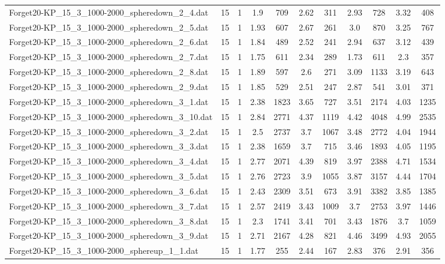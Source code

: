 \begin{table}[!ht]
\begin{tabular}{lcccccccccc}
Forget20-KP\_15\_3\_1000-2000\_spheredown\_2\_4.dat & 15 & 1 & 1.9 & 709 & 2.62 & 311 & 2.93 & 728 & 3.32 & 408 \\
Forget20-KP\_15\_3\_1000-2000\_spheredown\_2\_5.dat & 15 & 1 & 1.93 & 607 & 2.67 & 261 & 3.0 & 870 & 3.25 & 767 \\
Forget20-KP\_15\_3\_1000-2000\_spheredown\_2\_6.dat & 15 & 1 & 1.84 & 489 & 2.52 & 241 & 2.94 & 637 & 3.12 & 439 \\
Forget20-KP\_15\_3\_1000-2000\_spheredown\_2\_7.dat & 15 & 1 & 1.75 & 611 & 2.34 & 289 & 1.73 & 611 & 2.3 & 357 \\
Forget20-KP\_15\_3\_1000-2000\_spheredown\_2\_8.dat & 15 & 1 & 1.89 & 597 & 2.6 & 271 & 3.09 & 1133 & 3.19 & 643 \\
Forget20-KP\_15\_3\_1000-2000\_spheredown\_2\_9.dat & 15 & 1 & 1.85 & 529 & 2.51 & 247 & 2.87 & 541 & 3.01 & 371 \\
Forget20-KP\_15\_3\_1000-2000\_spheredown\_3\_1.dat & 15 & 1 & 2.38 & 1823 & 3.65 & 727 & 3.51 & 2174 & 4.03 & 1235 \\
Forget20-KP\_15\_3\_1000-2000\_spheredown\_3\_10.dat & 15 & 1 & 2.84 & 2771 & 4.37 & 1119 & 4.42 & 4048 & 4.99 & 2535 \\
Forget20-KP\_15\_3\_1000-2000\_spheredown\_3\_2.dat & 15 & 1 & 2.5 & 2737 & 3.7 & 1067 & 3.48 & 2772 & 4.04 & 1944 \\
Forget20-KP\_15\_3\_1000-2000\_spheredown\_3\_3.dat & 15 & 1 & 2.38 & 1659 & 3.7 & 715 & 3.46 & 1893 & 4.05 & 1195 \\
Forget20-KP\_15\_3\_1000-2000\_spheredown\_3\_4.dat & 15 & 1 & 2.77 & 2071 & 4.39 & 819 & 3.97 & 2388 & 4.71 & 1534 \\
Forget20-KP\_15\_3\_1000-2000\_spheredown\_3\_5.dat & 15 & 1 & 2.76 & 2723 & 3.9 & 1055 & 3.87 & 3157 & 4.44 & 1704 \\
Forget20-KP\_15\_3\_1000-2000\_spheredown\_3\_6.dat & 15 & 1 & 2.43 & 2309 & 3.51 & 673 & 3.91 & 3382 & 3.85 & 1385 \\
Forget20-KP\_15\_3\_1000-2000\_spheredown\_3\_7.dat & 15 & 1 & 2.57 & 2419 & 3.43 & 1009 & 3.7 & 2753 & 3.97 & 1446 \\
Forget20-KP\_15\_3\_1000-2000\_spheredown\_3\_8.dat & 15 & 1 & 2.3 & 1741 & 3.41 & 701 & 3.43 & 1876 & 3.7 & 1059 \\
Forget20-KP\_15\_3\_1000-2000\_spheredown\_3\_9.dat & 15 & 1 & 2.71 & 2167 & 4.28 & 821 & 4.46 & 3499 & 4.93 & 2055 \\
Forget20-KP\_15\_3\_1000-2000\_sphereup\_1\_1.dat & 15 & 1 & 1.77 & 255 & 2.44 & 167 & 2.83 & 376 & 2.91 & 356 \\

\end{tabular}
\end{table}
